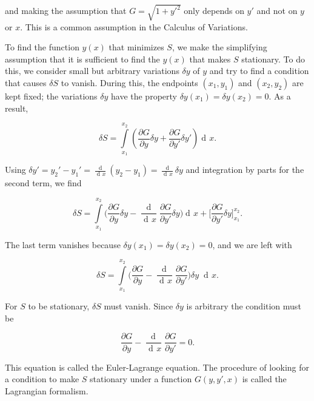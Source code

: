 \documentclass{article}
\DeclareMathOperator{\dd}{d\!}
\DeclareMathOperator{\ddd}{\mathrm{d}}
\begin{document}
and making the assumption that $G = \sqrt{1 + y'^2}$ only depends on $y'$ and not on $y$ or $x$. This is a common assumption in the Calculus of Variations.

To find the function $y(x)$ that minimizes %
$S$, we make the simplifying assumption that it is sufficient to find the $y(x)$ that makes $S$ stationary. To do this, we consider small but arbitrary variations $\delta y$ of $y$ and try to find a condition that causes $\delta S$ to vanish. During this, the endpoints $(x_1,y_1)$ and $(x_2,y_2)$ are kept fixed; the variations $\delta y$ have the property $\delta y(x_1) = \delta y(x_2) = 0$. As a result,

\begin{equation}
\delta S = \int\limits_{x_1}^{x_2} \left(\frac{\partial G}{\partial y} \delta y
+ \frac{\partial G}{\partial y'} \delta y' \right) \dd x.
\end{equation}

Using $\delta y' = y_2' - y_1' = \frac{\ddd }{\dd x}(y_2 - y_1) = \frac{\ddd}{\dd x} \delta y$ and integration by parts for the second term, we find

\begin{equation}
\delta S = \int\limits_{x_1}^{x_2} \bigg( \frac{\partial G}{\partial y} \delta y
- \frac{\ddd}{\dd x}\frac{\partial G}{\partial y'} \delta y \bigg) \dd x
+ \bigg[\frac{\partial G}{\partial y'} \delta y \bigg]_{x_1}^{x_2}.
\end{equation}

The last term vanishes because $\delta y(x_1) = \delta y(x_2) = 0$, and we are left with


\begin{equation}
\delta S = \int\limits_{x_1}^{x_2} \bigg( \frac{\partial G}{\partial y}
- \frac{\dd}{\dd x}\frac{\partial G}{\partial y'} \bigg) \delta y \; \dd x.
\end{equation}

For $S$ to be stationary, $\delta S$ must vanish. Since $\delta y$ is arbitrary the condition must be


\begin{equation}\label{e-l}
\frac{\partial G}{\partial y} - \frac{\dd}{\dd x}\frac{\partial G}{\partial y'} = 0.
\end{equation}

This equation is called the Euler-Lagrange equation. The procedure of looking for a condition to make $S$ stationary under a function $G(y,y',x)$ is called the Lagrangian formalism.\\
\end{document}
